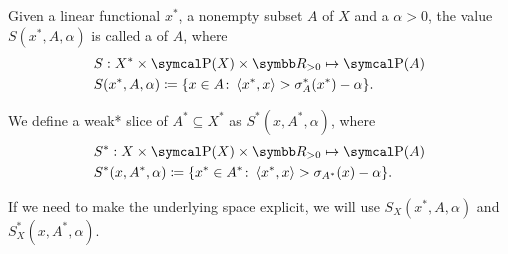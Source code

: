 \begin{definition}\label{def:banach_space_slice}\cite[definition 2.17]{Phelps1993}
  Given a linear functional \( x^* \), a nonempty subset \( A \) of \( X \) and a  \( \alpha > 0 \), the value \( S(x^*, A, \alpha) \) is called a  of \( A \), where
  \begin{align*}
    &S: X^* \times \Power(X) \times \R_{>0} \mapsto \Power(A) \\
    &S(x^*, A, \alpha) \coloneqq \{ x \in A \colon \Prod {x^*} x > \sigma_A^*(x^*) - \alpha \}.
  \end{align*}

  We define a weak* slice of \( A^* \subseteq X^* \) as \( S^*(x, A^*, \alpha) \), where
  \begin{align*}
    &S^*: X \times \Power(X) \times \R_{>0} \mapsto \Power(A) \\
    &S^*(x, A^*, \alpha) \coloneqq \{ x^* \in A^* \colon \Prod {x^*} x > \sigma_{A^*}(x) - \alpha \}.
  \end{align*}

  If we need to make the underlying space explicit, we will use \( S_X(x^*, A, \alpha) \) and \( S_X^*(x, A^*, \alpha) \).
\end{definition}
